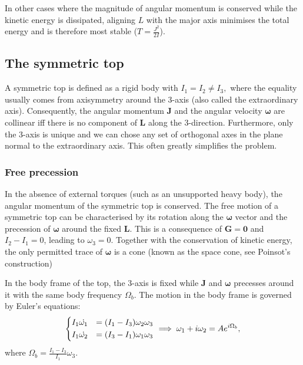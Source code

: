\documentclass{article}
\begin{document}
In other cases where the magnitude of angular momentum is conserved while the kinetic energy is dissipated, aligning $L$ with the major axis minimises the total energy and is therefore most stable ($T = \frac{J^2}{2I}$). 

\subsection{The symmetric top}
A symmetric top is defined as a rigid body with $I_1 = I_2 \neq I_3,$ where the equality usually comes from axisymmetry around the 3-axis (also called the extraordinary axis). Consequently, the angular momentum $\mathbf{J} $ and the angular velocity $\boldsymbol{\mathbf{\omega}} $ are collinear iff there is no component of $\mathbf{L}$ along the 3-direction. Furthermore, only the 3-axis is unique and we can chose any set of orthogonal axes in the plane normal to the extraordinary axis. This often greatly simplifies the problem. 

\subsubsection{Free precession}
In the absence of external torques (such as an unsupported heavy body), the angular momentum of the symmetric top is conserved. The free motion of a symmetric top can be characterised by its rotation along the $\boldsymbol{\mathbf{\omega}}$ vector and the precession of $\boldsymbol{\mathbf{\omega}}$ around the fixed $\mathbf{L} $. This is a consequence of $\mathbf{G} = \textbf{0} $ and $I_2 - I_1 = 0$, leading to $\omega_3 = 0$. Together with the conservation of kinetic energy, the only permitted trace of $\boldsymbol{\mathbf{\omega}}$ is a cone (known as the space cone, see Poinsot's construction)

In the body frame of the top, the 3-axis is fixed while $\mathbf{J}$ and $\boldsymbol{\mathbf{\omega}}$ precesses around it with the same body frequency $\Omega_b.$ The motion in the body frame is governed by Euler's equations:
\[
    \begin{dcases}
        I_1 \dot{\omega_1} &= (I_1 - I_3) \omega_2 \omega_3   \\
        I_1 \dot{\omega_2} &= (I_3 - I_1) \omega_1 \omega_3
    \end{dcases}
    \implies 
    \omega_1 + i \omega_2 = A e^{i \Omega_b},
\]
where $\boxed{\Omega_b = \frac{I_1 - I_3}{I_1}\omega_3}. $
\end{document}
